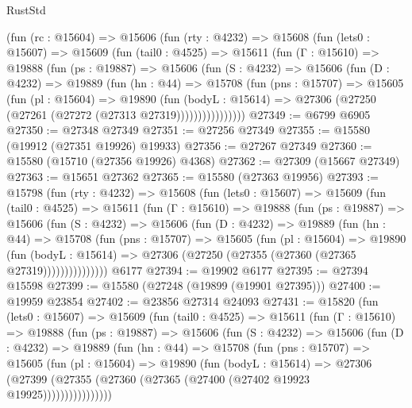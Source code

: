 \begin{lexlean}{RustStd}
\begin{coremodule}
    (fun (rc : @15604) =>
    @15606
      (fun (rty : @4232) =>
      @15608
        (fun (lets0 : @15607) =>
        @15609
          (fun (tail0 : @4525) =>
          @15611
            (fun (Γ : @15610) =>
            @19888
              (fun (ps : @19887) =>
              @15606
                (fun (S : @4232) =>
                @15606
                  (fun (D : @4232) =>
                  @19889
                    (fun (hn : @44) =>
                    @15708
                      (fun (pns : @15707) =>
                      @15605
                        (fun (pl : @15604) =>
                        @19890
                          (fun (bodyL : @15614) =>
                          @27306 (@27250 (@27261 (@27272 (@27313 @27319))))))))))))))))
@27349 := @6799 @6905
@27350 := @27348 @27349
@27351 := @27256 @27349
@27355 := @15580 (@19912 (@27351 @19926) @19933)
@27356 := @27267 @27349
@27360 := @15580 (@15710 (@27356 @19926) @4368)
@27362 := @27309 (@15667 @27349)
@27363 := @15651 @27362
@27365 := @15580 (@27363 @19956)
@27393 := @15798
    (fun (rty : @4232) =>
    @15608
      (fun (lets0 : @15607) =>
      @15609
        (fun (tail0 : @4525) =>
        @15611
          (fun (Γ : @15610) =>
          @19888
            (fun (ps : @19887) =>
            @15606
              (fun (S : @4232) =>
              @15606
                (fun (D : @4232) =>
                @19889
                  (fun (hn : @44) =>
                  @15708
                    (fun (pns : @15707) =>
                    @15605
                      (fun (pl : @15604) =>
                      @19890
                        (fun (bodyL : @15614) =>
                        @27306 (@27250 (@27355 (@27360 (@27365 @27319)))))))))))))))
    @6177
@27394 := @19902 @6177
@27395 := @27394 @15598
@27399 := @15580 (@27248 (@19899 (@19901 @27395)))
@27400 := @19959 @23854
@27402 := @23856 @27314 @24093
@27431 := @15820
    (fun (lets0 : @15607) =>
    @15609
      (fun (tail0 : @4525) =>
      @15611
        (fun (Γ : @15610) =>
        @19888
          (fun (ps : @19887) =>
          @15606
            (fun (S : @4232) =>
            @15606
              (fun (D : @4232) =>
              @19889
                (fun (hn : @44) =>
                @15708
                  (fun (pns : @15707) =>
                  @15605
                    (fun (pl : @15604) =>
                    @19890
                      (fun (bodyL : @15614) =>
                      @27306
                        (@27399
                          (@27355 (@27360 (@27365 (@27400 (@27402 @19923 @19925))))))))))))))))

\end{coremodule}
\end{lexlean}
